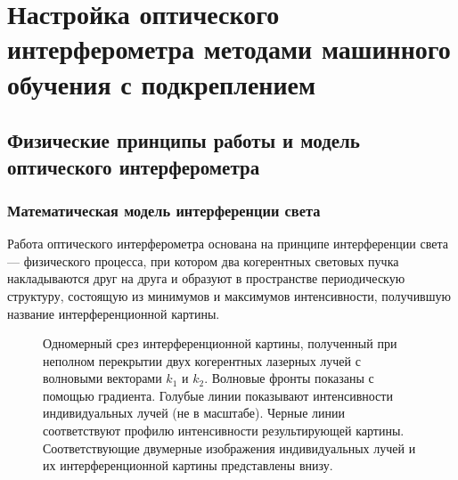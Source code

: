 \chapter{Настройка оптического интерферометра методами машинного обучения с подкреплением}\label{ch:ch2}

\section{Физические принципы работы и модель оптического интерферометра}\label{sec:ch2/sec1}

\subsection{Математическая модель интерференции света}\label{sec:ch2/sec1/subsec1}

Работа оптического интерферометра основана на принципе интерференции света --- физического процесса, при котором два когерентных световых пучка накладываются друг на друга и образуют в пространстве периодическую структуру, состоящую из минимумов и максимумов интенсивности, получившую название интерференционной картины. 

\begin{figure}[ht]
    \caption{Одномерный срез интерференционной картины, полученный при неполном перекрытии двух когерентных лазерных лучей с волновыми векторами $k_1$ и $k_2$. Волновые фронты показаны с помощью градиента. Голубые линии показывают интенсивности индивидуальных лучей (не в масштабе). Черные линии соответствуют профилю интенсивности результирующей картины. Соответствующие двумерные изображения индивидуальных лучей и их интерференционной картины представлены внизу.}\label{fig:two_beam_interf}
\end{figure}


